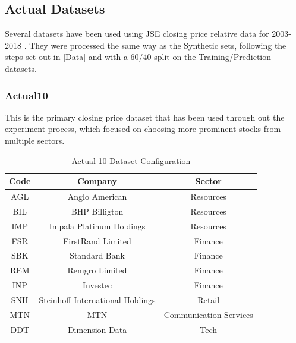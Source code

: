 \documentclass[a4paper,11pt,oneside]{article}
\theoremstyle{plain}
\theoremstyle{definition}
\begin{document}
\subsection{Actual Datasets}

Several datasets have been used using JSE closing price relative data for 2003-2018 . They were processed the same way as the Synthetic sets, following the steps set out in \ref{Data} and with a 60/40 split on the Training/Prediction datasets.

\subsubsection{Actual10}\label{dataset_actual10}

This is the primary closing price dataset that has been used through out the experiment process, which focused on choosing more prominent stocks from multiple sectors.

\begin{table}[H]
	\centering
	\begin{tabular}{|c|c|c|}
		\hline
		\textbf{Code} &\textbf{Company} & \textbf{Sector} \\\hline	
		{AGL} & {Anglo American} & {Resources}  \\\hline
		{BIL} & {BHP Billigton} & {Resources}  \\\hline
		{IMP} & {Impala Platinum Holdings} & {Resources}  \\\hline
		{FSR} & {FirstRand Limited} & {Finance}  \\\hline
		{SBK} & {Standard Bank} & {Finance}  \\\hline
		{REM} & {Remgro Limited} & {Finance}  \\\hline
		{INP} & {Investec} & {Finance}  \\\hline
		{SNH} & {Steinhoff International Holdings} & {Retail}    \\\hline
		{MTN} & {MTN} & {Communication Services}  \\\hline
		{DDT} & {Dimension Data} & {Tech} \\\hline
	\end{tabular}
	\newline\newline
	\caption{Actual 10 Dataset Configuration}\label{tab_actual10}
\end{table}
\end{document}
